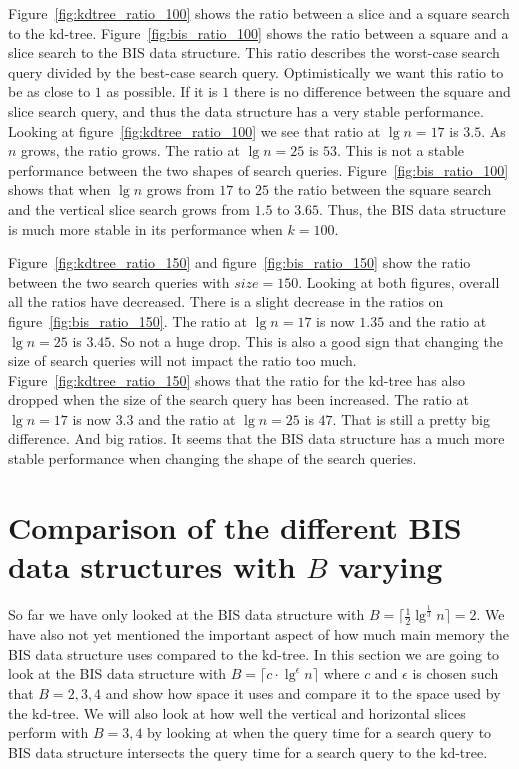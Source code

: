   Figure~\ref{fig:kdtree_ratio_100} shows the ratio between a slice and a square search to the kd-tree. Figure~\ref{fig:bis_ratio_100} shows the ratio between a square and a slice search to the BIS data structure. This ratio describes the worst-case search query divided by the best-case search query. Optimistically we want this ratio to be as close to $1$ as possible. If it is $1$ there is no difference between the square and slice search query, and thus the data structure has a very stable performance. Looking at figure~\ref{fig:kdtree_ratio_100} we see that ratio at $\lg n = 17$ is $3.5$. As $n$ grows, the ratio grows. The ratio at $\lg n = 25$ is $53$. This is not a stable performance between the two shapes of search queries. Figure~\ref{fig:bis_ratio_100} shows that when $\lg n$ grows from $17$ to $25$ the ratio between the square search and the vertical slice search grows from $1.5$ to $3.65$. Thus, the BIS data structure is much more stable in its performance when $k = 100$.

  Figure~\ref{fig:kdtree_ratio_150} and figure~\ref{fig:bis_ratio_150} show the ratio between the two search queries with $size = 150$. Looking at both figures, overall all the ratios have decreased. There is a slight decrease in the ratios on figure~\ref{fig:bis_ratio_150}. The ratio at $\lg n = 17$ is now $1.35$ and the ratio at $\lg n = 25$ is $3.45$. So not a huge drop. This is also a good sign that changing the size of search queries will not impact the ratio too much. Figure~\ref{fig:kdtree_ratio_150} shows that the ratio for the kd-tree has also dropped when the size of the search query has been increased. The ratio at $\lg n = 17$ is now $3.3$ and the ratio at $\lg n = 25$ is $47$. That is still a pretty big difference. And big ratios. It seems that the BIS data structure has a much more stable performance when changing the shape of the search queries.



 

\section{Comparison of the different BIS data structures with $B$ varying}

So far we have only looked at the BIS data structure with $B = \lceil \frac{1}{2}\lg^{\frac{1}{3}} n \rceil = 2$. We have also not yet mentioned the important aspect of how much main memory the BIS data structure uses compared to the kd-tree. In this section we are going to look at the BIS data structure with $B = \lceil c \cdot \lg^\epsilon n \rceil$ where $c$ and $\epsilon$ is chosen such that $B={2,3,4}$ and show how space it uses and compare it to the space used by the kd-tree. We will also look at how well the vertical and horizontal slices perform with $B={3,4}$ by looking at when the query time for a search query to BIS data structure intersects the query time for a search query to the kd-tree.

